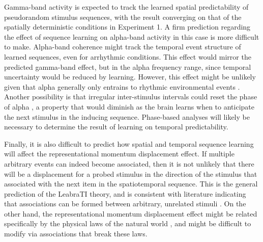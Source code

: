 \documentclass[defaultstyle,12pt]{thesis}
\begin{document}
{Gamma-band activity is expected to track the learned spatial predictability of pseudorandom stimulus sequences, with the result converging on that of the spatially deterministic conditions in Experiment 1. A firm prediction regarding the effect of sequence learning on alpha-band activity in this case is more difficult to make. Alpha-band coherence might track the temporal event structure of learned sequences, even for arrhythmic conditions. This effect would mirror the predicted gamma-band effect, but in the alpha frequency range, since temporal uncertainty would be reduced by learning. However, this effect might be unlikely given that alpha generally only entrains to rhythmic environmental events \cite{LakatosKarmosMehtaEtAl08,SchroederLakatos09}. Another possibility is that irregular inter-stimulus intervals could reset the phase of alpha \cite{LandauFries12,KlimeschSausengHanslmayr07,PalvaPalva07}, a property that would diminish as the brain learns when to anticipate the next stimulus in the inducing sequence. Phase-based analyses  will likely be necessary to determine the result of learning on temporal predictability.

Finally, it is also difficult to predict how spatial and temporal sequence learning will affect the representational momentum displacement effect. If multiple arbitrary events can indeed become associated, then it is not unlikely that there will be a displacement for a probed stimulus in the direction of the stimulus that associated with the next item in the spatiotemporal sequence. This is the general prediction of the LeabraTI theory, and is consistent with literature indicating that associations can be formed between arbitrary, unrelated stimuli \cite{Miyashita88,SakaiMiyashita91,MeyerOlson11}. On the other hand, the representational momentum displacement effect might be related specifically by the physical laws of the natural world \cite[e.g., spatiotemporal coherence, gravity, friction, etc., see]{Hubbard05}, and might be difficult to modify via associations that break these laws.

}
\end{document}
